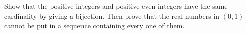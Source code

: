 Show that the positive integers and positive even integers have the same cardinality by giving a bijection. Then prove that the real numbers in $(0,1)$ cannot be put in a sequence containing every one of them.

